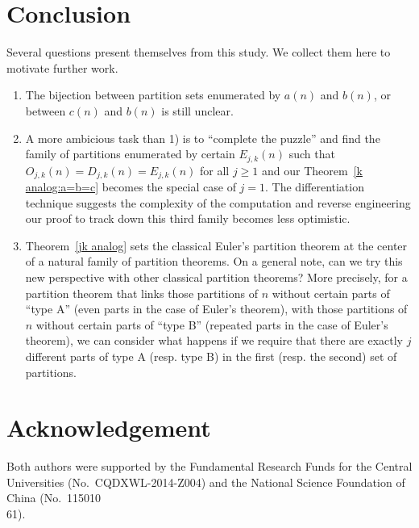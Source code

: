 \documentclass[12pt]{amsart}
\numberwithin{equation}{section}
\theoremstyle{plain}
\theoremstyle{definition}
\begin{document}
\section{Conclusion}
Several questions present themselves from this study. We collect them here to motivate further work.
\begin{enumerate}[1)]
\item The bijection between partition sets enumerated by $a(n)$ and $b(n)$, or between $c(n)$ and $b(n)$ is still unclear.
\item A more ambicious task than 1) is to ``complete the puzzle'' and find the family of partitions enumerated by certain $E_{j,k}(n)$ such that $O_{j,k}(n)=D_{j,k}(n)=E_{j,k}(n)$ for all $j\geq 1$ and our Theorem~\ref{k analog:a=b=c} becomes the special case of $j=1$. The differentiation technique suggests the complexity of the computation and reverse engineering our proof to track down this third family becomes less optimistic.
\item Theorem~\ref{jk analog} sets the classical Euler's partition theorem at the center of a natural family of partition theorems. On a general note, can we try this new perspective with other classical partition theorems? More precisely, for a partition theorem that links those partitions of $n$ without certain parts of ``type A'' (even parts in the case of Euler's theorem), with those partitions of $n$ without certain parts of ``type B'' (repeated parts in the case of Euler's theorem), we can consider what happens if we require that there are exactly $j$ different parts of type A (resp. type B) in the first (resp. the second) set of partitions.
\end{enumerate}




\section*{Acknowledgement}
Both authors were supported by the Fundamental Research Funds for the Central Universities (No.~CQDXWL-2014-Z004) and the National Science Foundation of China (No.~115010\\61).
\end{document}
